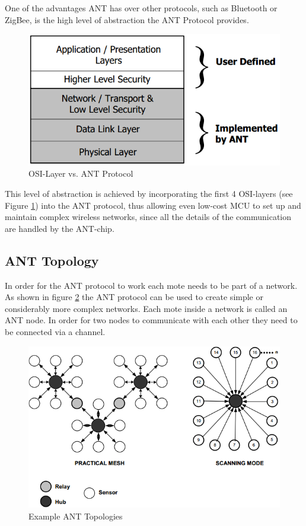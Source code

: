 One of the advantages ANT has over other protocols, such as Bluetooth or ZigBee, is the high level of abstraction the ANT Protocol provides. 
\begin{figure}[h]
	\centering
	\includegraphics[scale=.5]{content/images/ANTstack.png}
	\caption{OSI-Layer vs. ANT Protocol\cite{Networks}}\label{fig:osilayer}
\end{figure}

This level of abstraction is achieved by incorporating the first 4 OSI-layers (see Figure \ref{fig:osilayer}) into the ANT protocol, thus allowing even low-cost MCU to set up and maintain complex wireless networks, since all the details of the communication are handled by the ANT-chip.

\subsection{ANT Topology}
In order for the ANT protocol to work each mote needs to be part of a network. As shown in figure \ref{fig:anttopo} the ANT protocol can be used to create simple or considerably more complex networks. Each mote inside a network is called an ANT node. In order for two nodes to communicate with each other they need to be connected via a channel.

\begin{figure}[h]
	\centering
	\includegraphics[scale=0.7]{content/images/ANTtopo.png}
	\caption{Example ANT Topologies\cite{DynastreamInnovationsInc.2013}}\label{fig:anttopo}
\end{figure}

